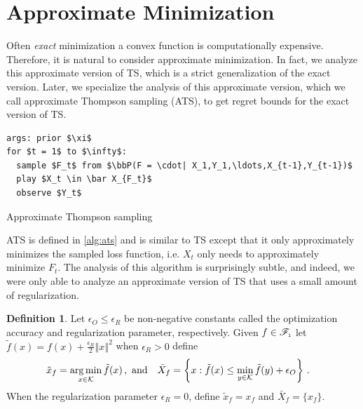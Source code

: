 \documentclass[letter, 12pt]{report}
\newcommand{\epsR}{{\epsilon_R}}
\newcommand{\epsO}{{\epsilon_O}}
\newcommand{\pl}{\text{\tiny\texttt{l}}}
\newcommand{\argmin}{\operatornamewithlimits{arg\,min}}
\newcommand{\norm}[1]{\left \Vert  #1 \right \Vert}
\newcommand{\cK}{\mathcal K}
\newcommand{\sF}{\mathscr F}
\newcommand{\bbP}{\mathbb P}
\newcommand{\1}{\mathbf{1}}
\newcommand{\ts}{\textsc{TS}\xspace}
\newcommand{\ats}{\textsc{ATS}}
\theoremstyle{plain}
\theoremstyle{definition}
\newtheorem{definition}[theorem]{Definition}
\theoremstyle{remark}
\begin{document}
\section{Approximate Minimization}
Often \textit{exact} minimization a convex function is computationally expensive.
Therefore, it is natural to consider approximate minimization.
In fact, we analyze this approximate version of \ts,
which is a strict generalization of the exact version.
Later, we specialize the analysis of this approximate version,
which we call approximate Thompson sampling (\ats{}),
to get regret bounds for the exact version of \ts.
\begin{algorithm}[h!]
    \begin{minipage}{12cm}
        \begin{mdframed}
            \begin{lstlisting}
args: prior $\xi$
for $t = 1$ to $\infty$:
  sample $F_t$ from $\bbP(F = \cdot| X_1,Y_1,\ldots,X_{t-1},Y_{t-1})$
  play $X_t \in \bar X_{F_t}$
  observe $Y_t$
\end{lstlisting}
            \caption{Approximate Thompson sampling}\label{alg:ats}
        \end{mdframed}
    \end{minipage}
\end{algorithm}
\ats{} is defined in \cref{alg:ats} and is similar to \ts except that it only approximately minimizes the sampled loss function,
i.e. $X_t$ only needs to approximately minimize $F_t$.
The analysis of this algorithm is surprisingly subtle,
and indeed, we were only able to analyze an approximate version of \ts that uses a small amount of regularization.

\begin{definition}\label{def:opt}
    Let $\epsO \leq \epsR$ be non-negative constants called the optimization accuracy and regularization parameter, respectively.
    Given $f \in \sF_{\pl}$ let $\tilde f(x) = f(x) + \frac{\epsR}{2} \norm{x}^2$ when $\epsR > 0$ define
    \begin{align*}
        \tilde x_f & = \argmin_{x \in \cK} \tilde f(x)\,,\,\,\text{and}                             &
        \bar X_f   & = \left\{x : \tilde f(x) \leq \min_{y \in \cK} \tilde f(y) + \epsO\right\} \,.
    \end{align*}
    When the regularization parameter $\epsR = 0$, define
    $\tilde x_f = x_f$
    and $\bar X_f = \{x_f\}$.
\end{definition}
\end{document}

